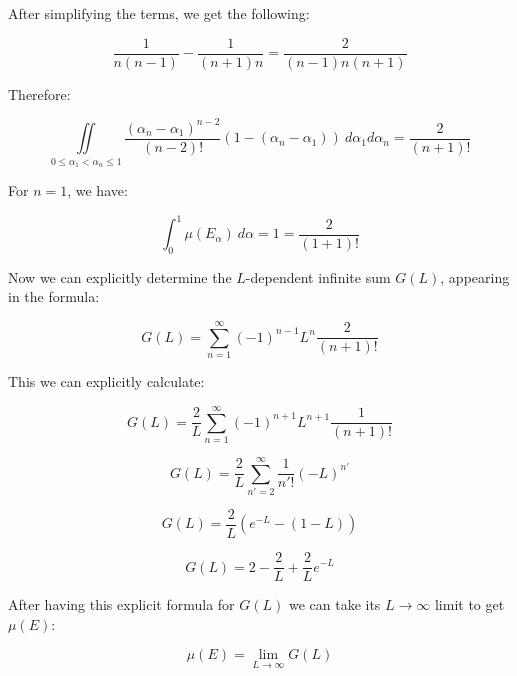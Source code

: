 \documentclass{article}
\theoremstyle{definition}
\begin{document}
\begin{appendices}
After simplifying the terms, we get the following:

\begin{equation}
    \frac{1}{n(n-1)} - \frac{1}{(n+1)n} = \frac{2}{(n-1)n(n+1)}
\end{equation}

Therefore:

\begin{equation}
    \iint\limits_{0 \le \alpha_1 < \alpha_n \le 1}
    \frac{(\alpha_n-\alpha_1)^{n-2}}{(n-2)!}
    (1-(\alpha_n-\alpha_1)) \ d\alpha_1 d\alpha_n
    =
    \frac{2}{(n+1)!}
\end{equation}

For $n=1$, we have:

\begin{equation}
    \int_0^1 \mu(E_\alpha) \ d \alpha = 1 = \frac{2}{(1+1)!}
\end{equation}

Now we can explicitly determine the $L$-dependent infinite sum $G(L)$, appearing in the formula:

\begin{equation}
    G(L) = \sum_{n=1}^\infty (-1)^{n-1} L^n
    \frac{2}{(n+1)!}
\end{equation}

This we can explicitly calculate:

\begin{equation}
    G(L)
    =
    \frac{2}{L} \sum_{n=1}^\infty (-1)^{n+1} L^{n+1}
    \frac{1}{(n+1)!}
\end{equation}

\begin{equation}
    G(L)
    =
    \frac{2}{L} \sum_{n'=2}^\infty \frac{1}{n'!} (-L)^{n'}
\end{equation}

\begin{equation}
    G(L)
    =
    \frac{2}{L} 
    \left(
    e^{-L} - (1-L)
    \right)
\end{equation}

\begin{equation}
     G(L)
    =
    2 - \frac{2}{L} + \frac{2}{L} e^{-L}
\end{equation}

After having this explicit formula for $G(L)$ we can take its $L \to \infty$ limit to get $\mu(E)$:

\begin{equation}
    \mu(E) = \lim_{L \to \infty} 
    G(L)
\end{equation}


\end{appendices}
\end{document}
